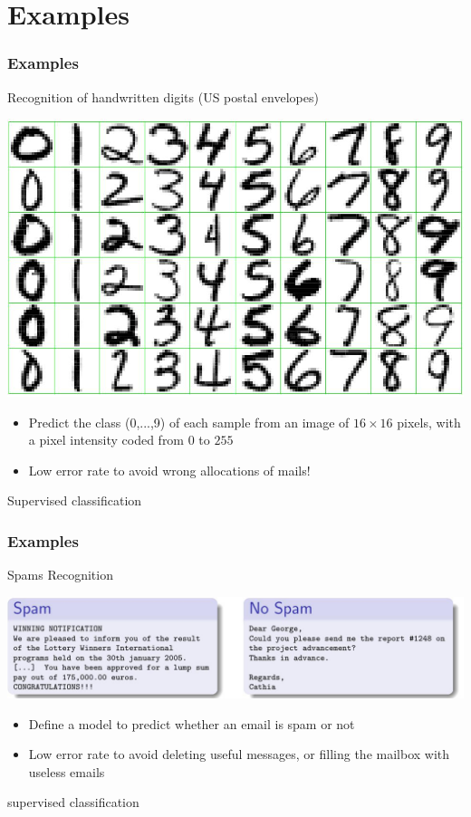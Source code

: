 \documentclass[compress, smaller, serif, 9pt]{beamer}
\newcommand{\structuretext}[1]{{\usebeamercolor[fg]{structure} #1}}
\newcommand{\doigt}{\structuretext{\noindent \Pisymbol{pzd}{43}}}
\begin{document}
\section{Examples}
\begin{frame}
  \frametitle{Examples}
\begin{block}{Recognition of handwritten digits (US postal envelopes)}
\begin{center}
  \includegraphics[width=.5\textwidth]{ex_handwriten.jpg}
\end{center}
\begin{itemize}
\item[\doigt] Predict the class (0,...,9) of each sample from an image of 
$16\times 16$ pixels, with a pixel intensity coded from $0$ to $255$
\item Low error rate to avoid wrong allocations of mails!
\end{itemize}
\end{block}
\begin{center}
 \alert{Supervised classification }
\end{center}
\end{frame}

\begin{frame}
  \frametitle{Examples}
\begin{block}{Spams Recognition}
\begin{center}
  \includegraphics[width=.8\textwidth]{ex_spams.jpg}
\end{center}
\begin{itemize}
\item[\doigt] 
Define a model to predict whether an email is spam or not
\item Low error rate to avoid deleting useful messages, or filling the mailbox with useless emails
\end{itemize}
\end{block}
\begin{center}
 \alert{supervised classification}
\end{center}

\end{frame}
\end{document}
